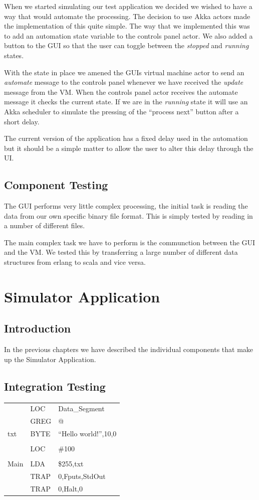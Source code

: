 \documentclass[a4paper,11pt]{report}
\begin{document}
When we started simulating our test application we decided we wished to have a way that would automate the processing. The decision to use Akka actors made the implementation of this quite simple. The way that we implemented this was to add an automation state variable to the controls panel actor. We also added a button to the GUI so that the user can toggle between the \textit{stopped} and \textit{running} states.

With the state in place we amened the GUIs virtual machine actor to send an \textit{automate} message to the controls panel whenever we have received the \textit{update} message from the VM. When the controls panel actor receives the automate message it checks the current state. If we are in the \textit{running} state it will use an Akka scheduler to simulate the pressing of the ``process next'' button after a short delay.

The current version of the application has a fixed delay used in the automation but it should be a simple matter to allow the user to alter this delay through the UI.

\section{Component Testing}
The GUI performs very little complex processing, the initial task is reading the data from our own specific binary file format. This is simply tested by reading in a number of different files.

The main complex task we have to perform is the communction between the GUI and the VM. We tested this by transferring a large number of different data structures from erlang to scala and vice versa.

\chapter{Simulator Application}
\section{Introduction}
In the previous chapters we have described the individual components that make up the Simulator Application.
\section{Integration Testing}
\begin{centering}
\begin{tabular}{ l l l }
 & LOC & Data\_Segment\\
 & GREG & @\\
txt & BYTE & ``Hello world!'',10,0\\
\\
 & LOC & \#100\\
\\
Main & LDA & \$255,txt\\
 & TRAP & 0,Fputs,StdOut\\
 & TRAP & 0,Halt,0\\
\end{tabular}
\end{centering}
\end{document}
